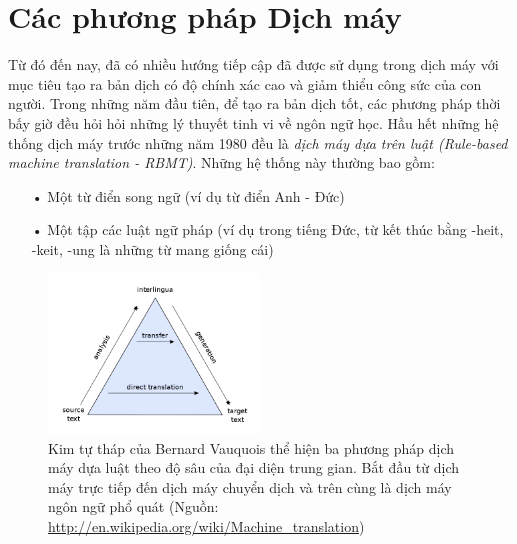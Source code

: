 

\section{Các phương pháp Dịch máy}

Từ đó đến nay, đã có nhiều hướng tiếp cập đã được sử dụng trong dịch máy với mục tiêu tạo ra bản dịch có độ chính xác cao và giảm thiểu công sức của con người. Trong những năm đầu tiên, để tạo ra bản dịch tốt, các phương pháp thời bấy giờ đều hỏi hỏi những lý thuyết tinh vi về ngôn ngữ học. Hầu hết những hệ thống dịch máy trước những năm 1980 đều là \textit{dịch máy dựa trên luật (Rule-based machine translation - RBMT)}. Những hệ thống này thường bao gồm:
\begin{itemize}
	\item[•] Một từ điển song ngữ (ví dụ từ điển Anh - Đức)
	\item[•] Một tập các luật ngữ pháp (ví dụ trong tiếng Đức, từ kết thúc bằng -heit, -keit, -ung là những từ mang giống cái)		
\end{itemize} 

\begin{figure}
	\centering
	\includegraphics[width=0.5\textwidth]{rulebasedpyramid}
	\caption[Ba phương pháp dịch máy dựa trên luật]{Kim tự tháp của Bernard Vauquois thể hiện ba phương pháp dịch máy dựa luật theo độ sâu của đại diện trung gian. Bắt đầu từ dịch máy trực tiếp đến dịch máy chuyển dịch và trên cùng là dịch máy ngôn ngữ phổ quát (Nguồn: \href{http://en.wikipedia.org/wiki/Machine_translation}{http://en.wikipedia.org/wiki/Machine\_translation})}
	\label{fig_rulebasedpyramid}
\end{figure}

